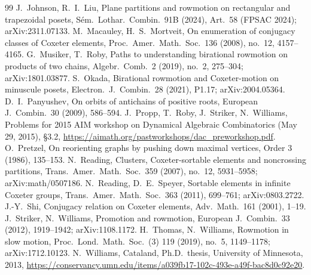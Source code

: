 \documentclass[11pt]{amsart}
\theoremstyle{definition}
\begin{document}
\begin{thebibliography}{99}
 J.~Johnson, R.~I.~Liu, Plane partitions and rowmotion on rectangular and trapezoidal posets, S\'em.\ Lothar.\ Combin.\ 91B (2024), Art.~58 (FPSAC 2024); arXiv:2311.07133.
 M.~Macauley, H.~S.~Mortveit, On enumeration of conjugacy classes of Coxeter elements, Proc.\ Amer.\ Math.\ Soc.\ 136 (2008), no.~12, 4157--4165.
 G.~Musiker, T.~Roby, Paths to understanding birational rowmotion on products of two chains, Algebr.\ Comb.\ 2 (2019), no.~2, 275--304; arXiv:1801.03877.
 S.~Okada, Birational rowmotion and Coxeter-motion on minuscule posets, Electron.\ J.\ Combin.\ 28 (2021), P1.17; arXiv:2004.05364.
 D.~I.~Panyushev, On orbits of antichains of positive roots, European J.\ Combin.\ 30 (2009), 586--594.
 J.~Propp, T.~Roby, J.~Striker, N.~Williams, Problems for 2015 AIM workshop on Dynamical Algebraic Combinatorics (May 29, 2015), \S3.2, \url{https://aimath.org/pastworkshops/dac_preworkshop.pdf}.
 O.~Pretzel, On reorienting graphs by pushing down maximal vertices, Order 3 (1986), 135--153.
 N.~Reading, Clusters, Coxeter-sortable elements and noncrossing partitions, Trans.\ Amer.\ Math.\ Soc.\ 359 (2007), no.~12, 5931--5958; arXiv:math/0507186.
 N.~Reading, D.~E.~Speyer, Sortable elements in infinite Coxeter groups, Trans.\ Amer.\ Math.\ Soc.\ 363 (2011), 699--761; arXiv:0803.2722.
 J.-Y.~Shi, Conjugacy relation on Coxeter elements, Adv.\ Math.\ 161 (2001), 1--19.
 J.~Striker, N.~Williams, Promotion and rowmotion, European J.\ Combin.\ 33 (2012), 1919--1942; arXiv:1108.1172.
 H.~Thomas, N.~Williams, Rowmotion in slow motion, Proc.\ Lond.\ Math.\ Soc.\ (3) 119 (2019), no.~5, 1149--1178; arXiv:1712.10123.
 N.~Williams, Cataland, Ph.D.\ thesis, University of Minnesota, 2013, \url{https://conservancy.umn.edu/items/a039fb17-102c-493e-a49f-bac8d0c92e20}.
\end{thebibliography}
\end{document}
